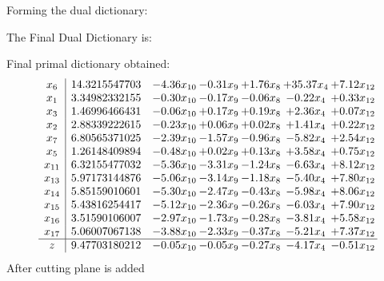 \documentclass[8pt]{article}
\begin{document}
Forming the dual dictionary:

The Final Dual Dictionary is: 

 Final primal dictionary obtained: 
\[\begin{array}{c| c c@{\hskip 2pt} c@{\hskip 2pt} c@{\hskip 2pt} c@{\hskip 2pt} c@{\hskip 2pt} }
 x_{6}   &  14.3215547703 & -4.36 x_{10} & -0.31 x_{9} & +  1.76 x_{8} & + 35.37 x_{4} & +  7.12 x_{12}\\
 x_{1}   &  3.34982332155 & -0.30 x_{10} & -0.17 x_{9} & -0.06 x_{8} & -0.22 x_{4} & +  0.33 x_{12}\\
 x_{3}   &  1.46996466431 & -0.06 x_{10} & +  0.17 x_{9} & +  0.19 x_{8} & +  2.36 x_{4} & +  0.07 x_{12}\\
 x_{2}   &  2.88339222615 & -0.23 x_{10} & +  0.06 x_{9} & +  0.02 x_{8} & +  1.41 x_{4} & +  0.22 x_{12}\\
 x_{7}   &  6.80565371025 & -2.39 x_{10} & -1.57 x_{9} & -0.96 x_{8} & -5.82 x_{4} & +  2.54 x_{12}\\
 x_{5}   &  1.26148409894 & -0.48 x_{10} & +  0.02 x_{9} & +  0.13 x_{8} & +  3.58 x_{4} & +  0.75 x_{12}\\
 x_{11}   &  6.32155477032 & -5.36 x_{10} & -3.31 x_{9} & -1.24 x_{8} & -6.63 x_{4} & +  8.12 x_{12}\\
 x_{13}   &  5.97173144876 & -5.06 x_{10} & -3.14 x_{9} & -1.18 x_{8} & -5.40 x_{4} & +  7.80 x_{12}\\
 x_{14}   &  5.85159010601 & -5.30 x_{10} & -2.47 x_{9} & -0.43 x_{8} & -5.98 x_{4} & +  8.06 x_{12}\\
 x_{15}   &  5.43816254417 & -5.12 x_{10} & -2.36 x_{9} & -0.26 x_{8} & -6.03 x_{4} & +  7.90 x_{12}\\
 x_{16}   &  3.51590106007 & -2.97 x_{10} & -1.73 x_{9} & -0.28 x_{8} & -3.81 x_{4} & +  5.58 x_{12}\\
 x_{17}   &  5.06007067138 & -3.88 x_{10} & -2.33 x_{9} & -0.37 x_{8} & -5.21 x_{4} & +  7.37 x_{12}\\
\hline
z    &  9.47703180212 & -0.05 x_{10} & -0.05 x_{9} & -0.27 x_{8} & -4.17 x_{4} & -0.51 x_{12}\\
\end{array}\]
 After cutting plane is added 
\end{document}
